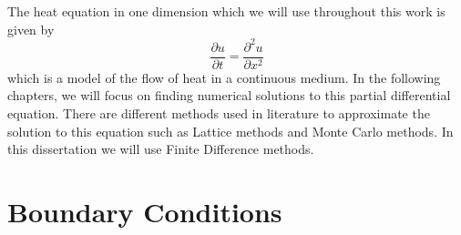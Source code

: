 \documentclass[00main.tex]{subfiles}
\begin{document}
The heat equation in one dimension which we will use throughout this work is given by \begin{equation}
\frac{\partial u}{\partial t} = \frac{\partial^2u}{\partial x^2} \label{heat}
\end{equation}  which is a model of the flow of heat in a continuous medium. %
In the following chapters, we will focus on finding numerical solutions to this partial differential equation. There are different methods used in literature to approximate the solution to this equation such as Lattice methods and Monte Carlo methods. In this dissertation we will use Finite Difference methods.


\section{Boundary Conditions}
\end{document}
